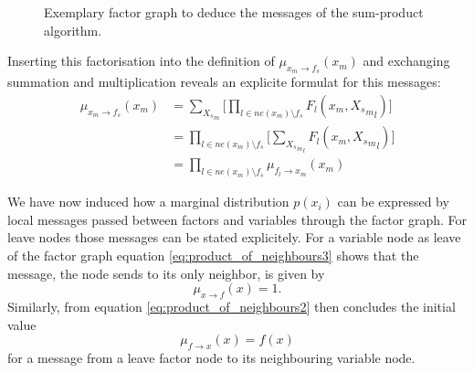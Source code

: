 \documentclass{sigkdd}
\begin{document}
\begin{figure}[h]
	\centering
	\caption{Exemplary factor graph to deduce the messages of the sum-product algorithm.}\label{fig:message3}
\end{figure}

Inserting this factorisation into the definition of $\mu_{x_m \rightarrow f_s}(x_m)$ and exchanging summation and multiplication reveals an explicite formulat for this messages:
\begin{equation}\label{eq:product_of_neighbours3}
    \begin{split}
        \mu_{x_m \rightarrow f_s}(x_m) &=\sum_{{X_s}_m} \Big[ \prod_{l \in ne(x_m) \setminus f_s} F_l(x_m, {{X_s}_m}_l) \Big] \\ &= \prod_{l \in ne(x_m) \setminus f_s} \Big[\sum_{{{X_s}_m}_l} F_l(x_m, {{X_s}_m}_l) \Big] \\ &= \prod_{l \in ne(x_m) \setminus f_s} \mu_{f_l \rightarrow x_m}(x_m)
    \end{split}
\end{equation}

We have now induced how a marginal distribution $p(x_i)$ can be expressed by local messages passed between factors and variables through the factor graph. For leave nodes those messages can be stated explicitely.
For a variable node as leave of the factor graph equation \ref{eq:product_of_neighbours3} shows that the message, the node sends to its only neighbor, is given by
\begin{equation}\label{eq:marg_init_1}
\mu_{x \rightarrow f}(x) = 1.
\end{equation}
Similarly, from equation \ref{eq:product_of_neighbours2} then concludes the initial value
\begin{equation}\label{eq:marg_init_2}
\mu_{f \rightarrow x}(x) = f(x)
\end{equation}
for a message from a leave factor node to its neighbouring variable node.
\end{document}
